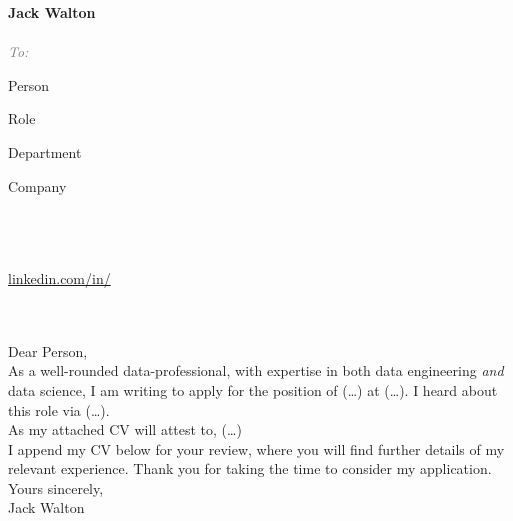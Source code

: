 \documentclass[12pt, a4paper]{article}
\begin{document}
\begin{minipage}[t]{0.6\textwidth}
{\huge\bf{}Jack Walton}\\[-.65em]

{\large{}}\\[3em]

\textcolor{gray}{\small\emph{To:}}

{\large

Person

Role

Department

Company

}
\end{minipage}%
\begin{minipage}[t]{0.4\textwidth}
\raggedleft

\href{mailto:\email}%
     {\email\hspace{\icontxtspace}}\\[0.45em]

\phone\hspace{\icontxtspace}\\[0.45em]

\href{\locationurl}%
     {\location\hspace{\icontxtspace}}\\[0.45em]

\href{https://www.linkedin.com/in/\linkedin/}%
     {linkedin.com/in/\linkedin\hspace{\icontxtspace}}\\[0.45em]

\href{https://github.com/\github}%
     {\github\hspace{\icontxtspace}}\\[0.45em]

\href{https://\website}%
     {\website\hspace{\icontxtspace}}

\end{minipage}\\[3em]

Dear Person,\\[.75em]

As a well-rounded data-professional, with expertise in both data engineering
\emph{and} data science, I am writing to apply for the position of (\ldots) at
(\ldots). I heard about this role via (\ldots).\\

As my attached CV will attest to, (\ldots)\\

I append my CV below for your review, where you will find further details of my
relevant experience. Thank you for taking the time to consider my
application.\\

Yours sincerely,\\[2em]

Jack Walton
\end{document}
